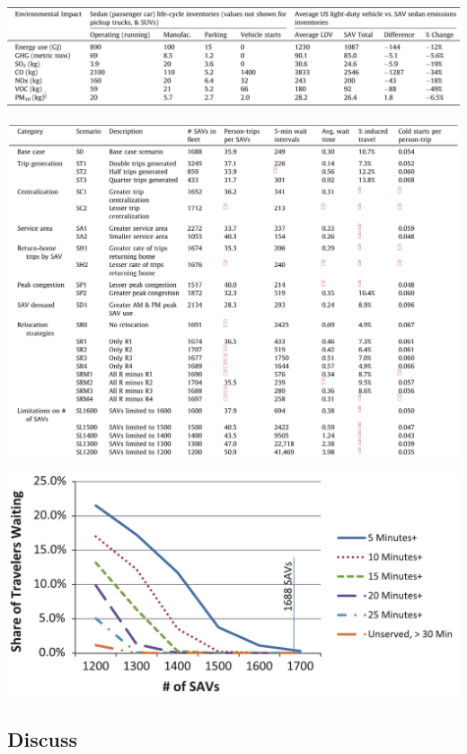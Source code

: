 \documentclass{beamer}
\begin{document}
\begin{frame}
  \includegraphics[width=\textwidth]{Fagnant-table-3.jpg}
\end{frame}

\begin{frame}
  \includegraphics[width=\textwidth]{Fagnant-table-4.jpg}
\end{frame}

\begin{frame}
  \includegraphics[width=\textwidth]{Fagnant-fig-6.jpg}
\end{frame}

\subsection{Discuss}
\end{document}
